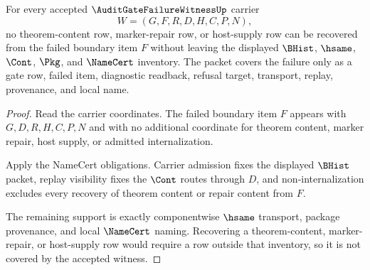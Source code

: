 \begin{theorem}
\label{thm:audit-gate-failure-witness-boundary-item-noninternalization-coverage}
For every accepted $\AuditGateFailureWitnessUp$ carrier
$$
W=(G,F,R,D,H,C,P,N),
$$
no theorem-content row, marker-repair row, or host-supply row can be recovered from the failed boundary item $F$ without leaving the displayed $\BHist$, $\hsame$, $\Cont$, $\Pkg$, and $\NameCert$ inventory. The packet covers the failure only as a gate row, failed item, diagnostic readback, refusal target, transport, replay, provenance, and local name.
\end{theorem}
\begin{proof}
Read the carrier coordinates. The failed boundary item $F$ appears with $G,D,R,H,C,P,N$ and with no additional coordinate for theorem content, marker repair, host supply, or admitted internalization.

Apply the NameCert obligations. Carrier admission fixes the displayed $\BHist$ packet, replay visibility fixes the $\Cont$ routes through $D$, and non-internalization excludes every recovery of theorem content or repair content from $F$.

The remaining support is exactly componentwise $\hsame$ transport, package provenance, and local $\NameCert$ naming. Recovering a theorem-content, marker-repair, or host-supply row would require a row outside that inventory, so it is not covered by the accepted witness.
\end{proof}

